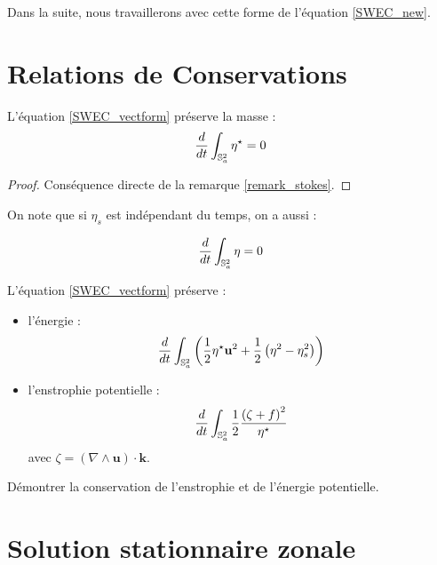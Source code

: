 Dans la suite, nous travaillerons avec cette forme de l'équation \eqref{SWEC_new}.


\section{Relations de Conservations}

\begin{proposition}
L'équation \eqref{SWEC_vectform} préserve la masse :
\begin{equation}
\dfrac{d}{dt}\displaystyle\int_{\mathbb{S}_a^2} \eta^{\star} = 0
\end{equation}
\end{proposition}

\begin{proof}
Conséquence directe de la remarque \ref{remark_stokes}.
\end{proof}

\begin{remarque}
On note que si $\eta_s$ est indépendant du temps, on a aussi :

\begin{equation}
\dfrac{d}{dt}\displaystyle\int_{\mathbb{S}_a^2} \eta = 0
\end{equation}
\end{remarque}

\begin{proposition}
L'équation \eqref{SWEC_vectform} préserve :
\begin{itemize}
\item l'énergie :
\begin{equation}
\dfrac{d}{dt} \displaystyle\int_{\mathbb{S}_a^2} \left( \dfrac{1}{2} \eta^{\star} \mathbf{u}^2 + \dfrac{1}{2} \left( \eta^2 - \eta_s^2 \right) \right)
\end{equation}
\item l'enstrophie potentielle :
\begin{equation}
\dfrac{d}{dt} \displaystyle\int_{\mathbb{S}_a^2} \dfrac{1}{2}\dfrac{\left(\zeta + f\right)^2}{\eta^{\star}}
\end{equation}
avec $\zeta=\left( \nabla \wedge \mathbf{u} \right)\cdot\mathbf{k}$.

\end{itemize}
\end{proposition}

\begin{com}
Démontrer la conservation de l'enstrophie et de l'énergie potentielle.
\end{com}

\section{Solution stationnaire zonale}

